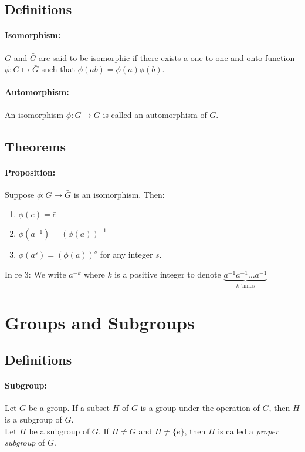 \documentclass[11pt, letterpaper]{article}
\newcommand{\inv}{^{-1}}
\begin{document}
	\subsection{Definitions}
		\paragraph{Isomorphism:}
			$G$ and $\bar G$ are said to be isomorphic if there exists a one-to-one and onto function $\phi: G \mapsto \bar G$ such that $\phi(ab) = \phi(a) \phi(b)$. 

		\paragraph{Automorphism:}
			An isomorphism $\phi: G \mapsto G$ is called an automorphism of $G$.

	\subsection{Theorems}
		\paragraph{Proposition:}
			Suppose $\phi: G \mapsto \bar G$ is an isomorphism.
			Then:
			\begin{enumerate}
				\item $\phi(e) = \bar e$ 
				\item $\phi(a\inv) =(\phi(a))\inv $ 
				\item $\phi(a^s) = (\phi(a))^s $ for any integer $s$.
			\end{enumerate}
			In re 3: We write $a^{-k}$ where $k$ is a positive integer to denote $\underbrace{a\inv a\inv \dots a\inv}_{k \text{ times}}$

\section{Groups and Subgroups}
	\subsection{Definitions}
		\paragraph{Subgroup:}
			Let $G$ be a group. 
			If a subset $H$ of $G$ is a group under the operation of $G$, then $H$ is a subgroup of $G$. \\
			Let $H$ be a subgroup of $G$.
			If $H \neq G$ and $H \neq \{e\}$, then $H$ is called a \emph{proper subgroup} of $G$.
\end{document}
